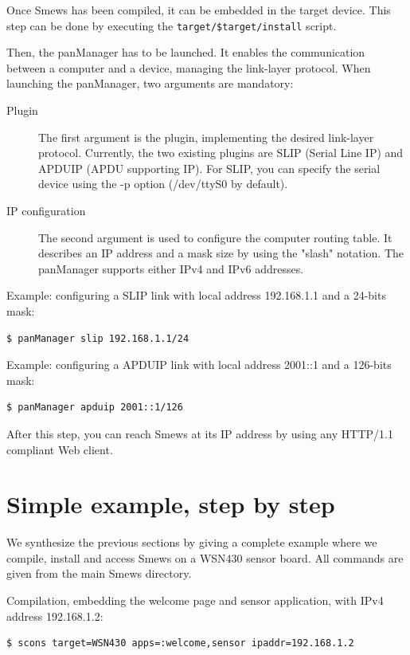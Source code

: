 \documentclass{report}
\begin{document}
Once Smews has been compiled, it can be embedded in the target device. This step can be done by executing the \verb+target/$target/install+ script.

Then, the panManager has to be launched. It enables the communication between a computer and a device, managing the link-layer protocol. When launching the panManager, two arguments are mandatory:

\begin{description}
\item[Plugin] The first argument is the plugin, implementing the desired link-layer protocol. Currently, the two existing plugins are SLIP (Serial Line IP) and APDUIP (APDU supporting IP). For SLIP, you can specify the serial device using the -p option (/dev/ttyS0 by default). 
\item[IP configuration] The second argument is used to configure the computer routing table. It describes an IP address and a mask size by using the "slash" notation. The panManager supports either IPv4 and IPv6 addresses.
\end{description}

Example: configuring a SLIP link with local address 192.168.1.1 and a 24-bits mask:
\begin{verbatim}
$ panManager slip 192.168.1.1/24
\end{verbatim}

Example: configuring a APDUIP link with local address 2001::1 and a 126-bits mask:
\begin{verbatim}
$ panManager apduip 2001::1/126
\end{verbatim}

After this step, you can reach Smews at its IP address by using any HTTP/1.1 compliant Web client.

\section{Simple example, step by step}

We synthesize the previous sections by giving a complete example where we compile, install and access Smews on a WSN430 sensor board. All commands are given from the main Smews directory.

Compilation, embedding the welcome page and sensor application, with IPv4 address 192.168.1.2:
\begin{verbatim}
$ scons target=WSN430 apps=:welcome,sensor ipaddr=192.168.1.2
\end{verbatim}
\end{document}
